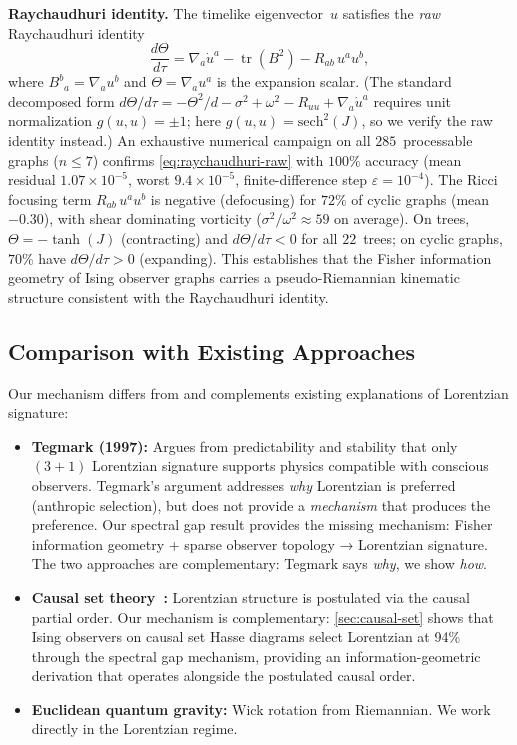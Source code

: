 \documentclass[11pt]{article}
\theoremstyle{definition}
\theoremstyle{remark}
\begin{document}
\medskip
\noindent\textbf{Raychaudhuri identity.}
The timelike eigenvector~$u$ satisfies the \emph{raw} Raychaudhuri identity
\begin{equation}
  \frac{d\Theta}{d\tau}
  = \nabla_a \dot{u}^a - \operatorname{tr}(B^2) - R_{ab}\,u^a u^b,
  \label{eq:raychaudhuri-raw}
\end{equation}
where $B^b{}_a = \nabla_a u^b$ and $\Theta = \nabla_a u^a$ is the expansion
scalar. (The standard decomposed form
$d\Theta/d\tau = -\Theta^2/d - \sigma^2 + \omega^2 - R_{uu} + \nabla_a \dot{u}^a$
requires unit normalization $g(u,u) = \pm 1$; here $g(u,u) = \mathrm{sech}^2(J)$,
so we verify the raw identity instead.)
An exhaustive numerical campaign on all $285$~processable graphs
($n \leq 7$) confirms \cref{eq:raychaudhuri-raw} with $100\%$
accuracy (mean residual $1.07 \times 10^{-5}$, worst
$9.4 \times 10^{-5}$, finite-difference step $\varepsilon = 10^{-4}$).
The Ricci focusing term $R_{ab}\,u^a u^b$ is negative (defocusing)
for $72\%$ of cyclic graphs (mean $-0.30$), with shear dominating
vorticity ($\sigma^2 / \omega^2 \approx 59$ on average).
On trees, $\Theta = -\tanh(J)$ (contracting) and $d\Theta/d\tau < 0$
for all $22$~trees; on cyclic graphs, $70\%$ have $d\Theta/d\tau > 0$
(expanding). This establishes that the Fisher information geometry
of Ising observer graphs carries a pseudo-Riemannian
kinematic structure consistent with the Raychaudhuri identity.

\subsection{Comparison with Existing Approaches}

Our mechanism differs from and complements existing explanations of Lorentzian
signature:

\begin{itemize}
  \item \textbf{Tegmark (1997):} Argues from predictability and stability that
    only $(3+1)$ Lorentzian signature supports physics compatible with
    conscious observers. Tegmark's argument addresses \emph{why} Lorentzian is
    preferred (anthropic selection), but does not provide a \emph{mechanism}
    that produces the preference. Our spectral gap result provides the missing
    mechanism: Fisher information geometry + sparse observer topology →
    Lorentzian signature. The two approaches are complementary: Tegmark says
    \emph{why}, we show \emph{how}.

  \item \textbf{Causal set theory~\cite{Bombelli1987,Sorkin1991}:}
    Lorentzian structure is postulated via the causal partial order.
    Our mechanism is complementary: \cref{sec:causal-set} shows that
    Ising observers on causal set Hasse diagrams select Lorentzian at
    94\% through the spectral gap mechanism, providing an
    information-geometric derivation that operates alongside the
    postulated causal order.

  \item \textbf{Euclidean quantum gravity:} Wick rotation from Riemannian.
    We work directly in the Lorentzian regime.
\end{itemize}
\end{document}
